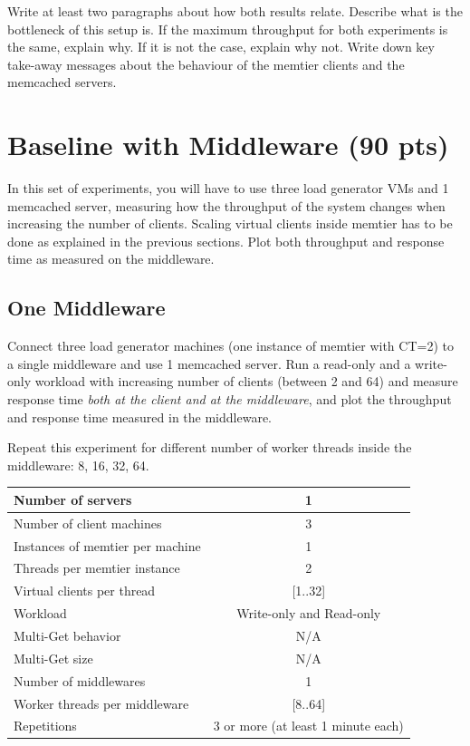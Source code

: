\documentclass[11pt,a4paper]{article}
\begin{document}
Write at least two paragraphs about how both results relate. Describe what is the bottleneck of this setup is. If the maximum throughput for both experiments is the same, explain why. If it is not the case, explain why not. Write down key take-away messages about the behaviour of the memtier clients and the memcached servers.

\section{Baseline with Middleware (90 pts)}
\label{sec:3.1}

In this set of experiments, you will have to use three load generator VMs and 1 memcached server, measuring how the throughput of the system changes when increasing the number of clients. Scaling virtual clients inside memtier has to be done as explained in the previous sections. Plot both throughput and response time as measured on the middleware.

\subsection{One Middleware}

Connect three load generator machines (one instance of memtier with CT=2) to a single middleware and use 1 memcached server. Run a read-only and a write-only workload with increasing number of clients (between 2 and 64) and measure response time \emph{both at the client and at the middleware}, and plot the throughput and response time measured in the middleware.

Repeat this experiment for different number of worker threads inside the middleware: 8, 16, 32, 64.

\begin{center}
	\scriptsize{
		\begin{tabular}{|l|c|}
			\hline Number of servers                & 1                        \\ 
			\hline Number of client machines        & 3                        \\ 
			\hline Instances of memtier per machine & 1                        \\ 
			\hline Threads per memtier instance     & 2                        \\
			\hline Virtual clients per thread       & [1..32]                  \\ 
			\hline Workload                         & Write-only and Read-only \\
			\hline Multi-Get behavior               & N/A                      \\
			\hline Multi-Get size                   & N/A                      \\
			\hline Number of middlewares            & 1                        \\
			\hline Worker threads per middleware    & [8..64]                  \\
			\hline Repetitions                      & 3 or more (at least 1 minute each)                \\ 
			\hline 
		\end{tabular}
	} 
\end{center}
\end{document}
